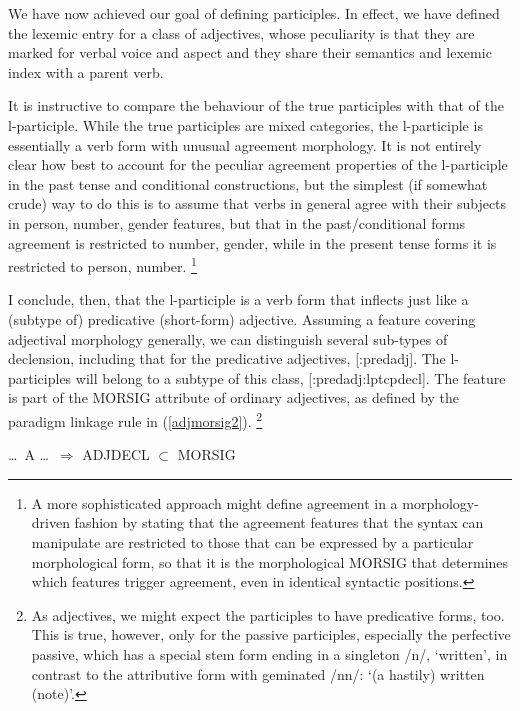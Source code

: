 \documentclass[output=paper,
modfonts
]{LSP/langsci}
\begin{document}
We have now achieved our goal of defining participles. In effect, we have defined the lexemic entry for a class of adjectives, whose peculiarity is that they are marked for verbal voice and aspect and they share their semantics and lexemic index with a parent verb. 


It is instructive to compare the behaviour of the true participles with that of the l-participle. While the true participles are mixed categories, the l-participle is essentially a verb form with unusual agreement morphology. It is not entirely clear how best to account for the peculiar agreement properties of the l-participle in the past tense and conditional constructions, but the simplest (if somewhat crude) way to do this is to assume that verbs in general agree with their subjects in person, number, gender features, but that in the past/conditional forms agreement is restricted to number, gender, while in the present tense forms it is restricted to person, number.%
\footnote{A more sophisticated approach might define agreement in a morphology-driven fashion by stating that the agreement features that the syntax can manipulate are restricted to those that can be expressed by a particular morphological form, so that it is the morphological MORSIG that determines which features trigger agreement, even in identical syntactic positions.} %

I conclude, then, that the  l-participle is a verb form that inflects just like a (subtype of) predicative (short-form) adjective. Assuming a feature  covering adjectival morphology generally, we can distinguish several sub-types of declension, including that for the predicative adjectives, [:predadj]. The l-participles will belong to a subtype of this class, [:predadj:lptcpdecl]. The  feature is part of the MORSIG attribute of ordinary adjectives, as defined by the paradigm linkage rule in (\ref{adjmorsig2}).%
\footnote{As adjectives, we might expect the participles to have predicative forms, too. This is true, however, only for the passive participles, especially the perfective passive,  which has a special stem form ending in a singleton /n/,  ‘written’, in contrast to the attributive form with geminated /nn/:  ‘(a hastily) written (note)’.} %

\begin{exe}
\ex
\label{adjmorsig2}

\ldots\ A \ldots\ $\Rightarrow$ ADJDECL $\subset$ MORSIG
\end{exe}
\end{document}
